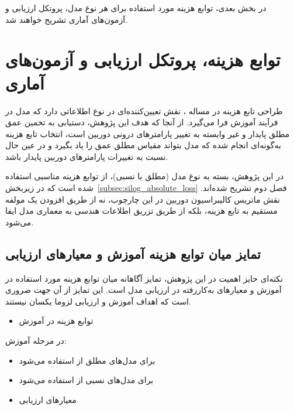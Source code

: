 در بخش بعدی، توابع هزینه مورد استفاده برای هر نوع مدل، پروتکل ارزیابی و آزمون‌های آماری تشریح خواهند شد.





\section[توابع هزینه، پروتکل ارزیابی و آزمون‌های آماری]{توابع هزینه، پروتکل ارزیابی و آزمون‌های آماری}
\label{sec:loss_functions}

طراحی تابع هزینه در مساله ، نقش تعیین‌کننده‌ای در نوع اطلاعاتی دارد که مدل در فرآیند آموزش فرا می‌گیرد. از آنجا که هدف این پژوهش، دستیابی به تخمین عمق مطلق پایدار و غیر وابسته به تغییر پارامترهای درونی دوربین است، انتخاب تابع هزینه به‌گونه‌ای انجام شده که مدل بتواند مقیاس مطلق عمق را یاد بگیرد و در عین حال نسبت به تغییرات پارامترهای دوربین پایدار باشد.

در این پژوهش، بسته به نوع مدل (مطلق یا نسبی)، از توابع هزینه مناسبی استفاده شده است که در زیربخش~{\ref{subsec:silog_absolute_loss}} فصل دوم تشریح شده‌اند. نقش ماتریس کالیبراسیون دوربین در این چارچوب، نه از طریق افزودن یک مولفه مستقیم به تابع هزینه، بلکه از طریق تزریق اطلاعات هندسی به معماری مدل ایفا می‌شود.

\subsection{تمایز میان توابع هزینه آموزش و معیارهای ارزیابی}

نکته‌ای حایز اهمیت در این پژوهش، تمایز آگاهانه میان توابع هزینه مورد استفاده در آموزش و معیارهای به‌کاررفته در ارزیابی مدل است. این تمایز از آن جهت ضروری است که اهداف آموزش و ارزیابی لزوما یکسان نیستند.

\begin{itemize}
\item توابع هزینه در آموزش
\end{itemize}

در مرحله آموزش:
\begin{itemize}
 \item برای مدل‌های مطلق از  استفاده می‌شود
 \item برای مدل‌های نسبی از  استفاده می‌شود
\end{itemize}

\begin{itemize}
\item معیارهای ارزیابی
\end{itemize}


